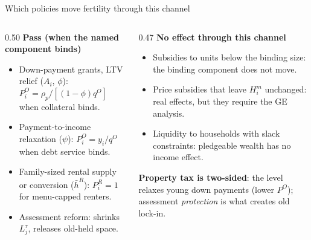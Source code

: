 \documentclass[11pt,aspectratio=169]{beamer}
\newcommand{\1}{\mathbf 1}
\begin{document}
\begin{frame}{Which policies move fertility through this channel}
\small
\begin{columns}[T]
\begin{column}{0.50\textwidth}
\textbf{Pass (when the named component binds)}
\footnotesize
\begin{itemize}\setlength{\itemsep}{0.35em}
  \item Down-payment grants, LTV relief ($A_i$, $\phi$): $P_i^O=\rho_p/[(1-\phi)q^O]$ when collateral binds.
  \item Payment-to-income relaxation ($\psi$): $P_i^O=y_i/q^O$ when debt service binds.
  \item Family-sized rental supply or conversion ($\bar h^R$): $P_i^R=1$ for menu-capped renters.
  \item Assessment reform: shrinks $L_j^\tau$, releases old-held space.
\end{itemize}
\end{column}
\begin{column}{0.47\textwidth}
\textbf{No effect through this channel}
\footnotesize
\begin{itemize}\setlength{\itemsep}{0.35em}
  \item Subsidies to units below the binding size: the binding component does not move.
  \item Price subsidies that leave $H_i^m$ unchanged: real effects, but they require the GE analysis.
  \item Liquidity to households with slack constraints: pledgeable wealth has no income effect.
\end{itemize}
\smallskip
\textbf{Property tax is two-sided}: the level relaxes young down payments (lower $P^O$); assessment \emph{protection} is what creates old lock-in.
\end{column}
\end{columns}
\end{frame}
\end{document}
